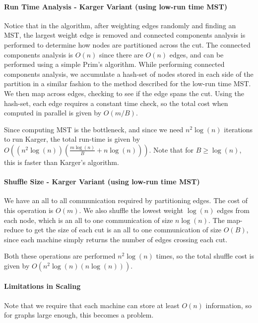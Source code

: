 \documentclass[12pt]{article}
\begin{document}
\paragraph{Run Time Analysis - Karger Variant (using low-run time MST)}

Notice that in the algorithm, after weighting edges randomly and finding an MST, the largest weight edge is removed and connected components analysis is performed to determine how nodes are partitioned across the cut. The connected components analysis is $O(n)$ since there are $O(n)$ edges, and can be performed using a simple Prim's algorithm. While performing connected components analysis, we accumulate a hash-set of nodes stored in each side of the partition in a similar fashion to the method described for the low-run time MST. We then map across edges, checking to see if the edge spans the cut. Using the hash-set, each edge requires a constant time check, so the total cost when computed in parallel is given by $O(m/B)$.

Since computing MST is the bottleneck, and since we need $n^2 \log(n)$ iterations to run Karger, the total run-time is given by \\
$O((n^2 \log(n)) (\frac{m \log(n)}{B} + n \log(n)))$. Note that for $B \geq \log(n)$, this is faster than Karger's algorithm.

\paragraph{Shuffle Size - Karger Variant (using low-run time MST)}

We have an all to all communication required by partitioning edges. The cost of this operation is $O(m)$. We also shuffle the lowest weight $\log(n)$ edges from each node, which is an all to one communication of size $n \log(n)$. The map-reduce to get the size of each cut is an all to one communication of size $O(B)$, since each machine simply returns the number of edges crossing each cut.

Both these operations are performed $n^2\log(n)$ times, so the total shuffle cost is given by $O(n^2\log(n) (n \log(n)))$. 

\paragraph{Limitations in Scaling}
Note that we require that each machine can store at least $O(n)$ information, so for graphs large enough, this becomes a problem.
\end{document}
